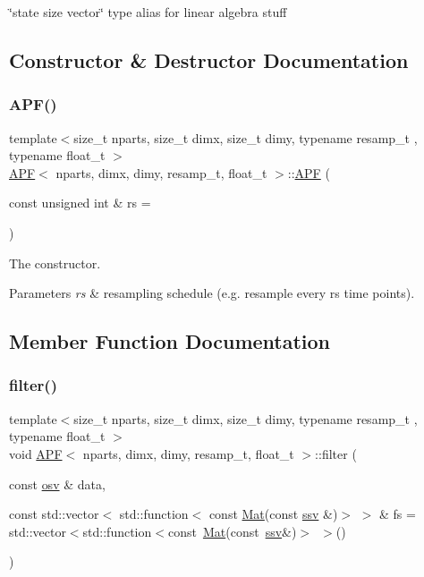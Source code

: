 \char`\"{}state size vector\char`\"{} type alias for linear algebra stuff 

\subsection{Constructor \& Destructor Documentation}
\mbox{\label{classAPF_af11ebba0fda9017d21f5d88521584210}} 
\subsubsection{\texorpdfstring{A\+P\+F()}{APF()}}
{\footnotesize\ttfamily template$<$size\+\_\+t nparts, size\+\_\+t dimx, size\+\_\+t dimy, typename resamp\+\_\+t , typename float\+\_\+t $>$ \\
\hyperlink{classAPF}{A\+PF}$<$ nparts, dimx, dimy, resamp\+\_\+t, float\+\_\+t $>$\+::\hyperlink{classAPF}{A\+PF} (\begin{DoxyParamCaption}\item[{const unsigned int \&}]{rs = {} }\end{DoxyParamCaption})}



The constructor. 


\begin{DoxyParams}{Parameters}
{\em rs} & resampling schedule (e.\+g. resample every rs time points). \\
\hline
\end{DoxyParams}


\subsection{Member Function Documentation}
\mbox{\label{classAPF_ab97631b9df8b63e830070604e6887b42}} 
\subsubsection{\texorpdfstring{filter()}{filter()}}
{\footnotesize\ttfamily template$<$size\+\_\+t nparts, size\+\_\+t dimx, size\+\_\+t dimy, typename resamp\+\_\+t , typename float\+\_\+t $>$ \\
void \hyperlink{classAPF}{A\+PF}$<$ nparts, dimx, dimy, resamp\+\_\+t, float\+\_\+t $>$\+::filter (\begin{DoxyParamCaption}\item[{const \hyperlink{classAPF_aa8ac25c475e54ddf21999f28727a049e}{osv} \&}]{data,  }\item[{const std\+::vector$<$ std\+::function$<$ const \hyperlink{classAPF_a448066ff44c8afb24c89bcea11d604c6}{Mat}(const \hyperlink{classAPF_a5f96da87f00ff75af1232f9021daf06a}{ssv} \&)$>$ $>$ \&}]{fs = {\ttfamily std\+:\+:vector$<$std\+:\+:function$<$const~\hyperlink{classAPF_a448066ff44c8afb24c89bcea11d604c6}{Mat}(const~\hyperlink{classAPF_a5f96da87f00ff75af1232f9021daf06a}{ssv}\&)$>$~$>$()} }\end{DoxyParamCaption})}



